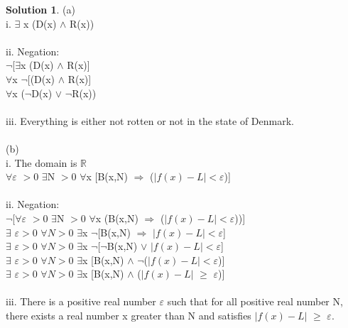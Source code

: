 \documentclass{article}
\theoremstyle{definition}
\newtheorem*{solution}{Solution}
\begin{document}
\begin {solution}
(a)\\
i.	\(\exists\) x (D(x) \(\wedge\) R(x))\\\\
ii.	Negation: \\
\(\neg\)[\(\exists\)x (D(x) \(\wedge\) R(x)]\\
\(\forall\)x \(\neg\)[(D(x) \(\wedge\) R(x)]\\
\(\forall\)x (\(\neg\)D(x) \(\vee\) \(\neg\)R(x))\\\\
iii.	Everything is either not rotten or not in the state of Denmark.\\\\
(b)\\
i.	The domain is \(\mathbb{R}\)\\
\(\forall\)\(\varepsilon\) \(> 0\) \(\exists\)N \(> 0\) \(\forall\)x [B(x,N) \(\Rightarrow\) (\(|f(x) - L| <\)\(\varepsilon\))]\\\\
ii. Negation:\\
\(\neg\)[\(\forall\)\(\varepsilon\) \(> 0\) \(\exists\)N \(> 0\) \(\forall\)x (B(x,N) \(\Rightarrow\) (\(|f(x) - L| <\)\(\varepsilon\)))]\\
\(\exists\) \(\varepsilon > 0\) \(\forall N > 0\) \(\exists\)x \(\neg\)[B(x,N) \(\Rightarrow\) \(|f(x) - L| <\)\(\varepsilon\)]\\
\(\exists\) \(\varepsilon > 0\) \(\forall N > 0\) \(\exists\)x \(\neg\)[\(\neg\)B(x,N) \(\vee\) \(|f(x) - L| <\)\(\varepsilon\)]\\
\(\exists\) \(\varepsilon > 0\) \(\forall N > 0\) \(\exists\)x [B(x,N) \(\wedge\) \(\neg\)(\(|f(x) - L| <\)\(\varepsilon\))]\\
\(\exists\) \(\varepsilon > 0\) \(\forall N > 0\) \(\exists\)x [B(x,N) \(\wedge\) (\(|f(x) - L|\) \(\geq\) \(\varepsilon\))]\\\\
iii. There is a positive real number \(\varepsilon\) such that for all positive real number N, there exists a real number x greater than N and satisfies \(|f(x) - L|\) \(\geq\) \(\varepsilon\).\\\\


\end {solution}
\end{document}
